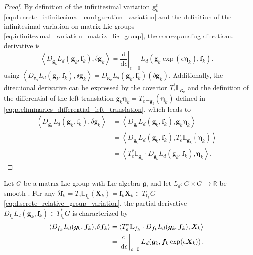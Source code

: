 \begin{proof}
By definition of the infinitesimal variation $\bm{g}_k^\epsilon$ \eqref{eq:discrete_infinitesimal_configuration_variation} and the definition of the infinitesimal 
variation on matrix Lie groups \eqref{eq:infinitesimal_variation_matrix_lie_group}, the corresponding directional derivative is
\begin{equation*}
    \left\langle D_{\bm{g}_k}L_d(\bm{g}_k,\bm{f}_k),\delta\bm{g}_k\right\rangle
    =
    \left.\frac{\mathrm d}{\mathrm d\epsilon}\right|_{\epsilon=0}
    L_d\!\left(\bm{g}_k\exp(\epsilon\bm{\eta}_k),\bm{f}_k\right).
\end{equation*}
using $\left\langle D_{\bm{g}_k}L_d(\bm{g}_k,\bm{f}_k),\delta\bm{g}_k\right\rangle = D_{\bm{g}_k}L_d(\bm{g}_k,\bm{f}_k)(\delta\bm{g}_k)$.
Additionally, the directional derivative can be expressed by the covector $T_e^*\mathbb{L}_{\bm{g}_k}$ and the definition of the differential 
of the left translation $\bm{g}_k \bm{\eta}_k = T_e\mathbb{L}_{\bm{g}_k}(\bm{\eta}_k)$ defined in \eqref{eq:preliminaries_differential_left_translation}, which leads to
\begin{align*}
    \left\langle D_{\bm{g}_k}L_d(\bm{g}_k,\bm{f}_k),\delta\bm{g}_k\right\rangle
    &=
    \left\langle D_{\bm{g}_k}L_d(\bm{g}_k,\bm{f}_k),\bm{g}_k \bm{\eta}_k\right\rangle \\
    &=
    \left\langle D_{\bm{g}_k}L_d(\bm{g}_k,\bm{f}_k),T_e\mathbb{L}_{\bm{g}_k}(\bm{\eta}_k)\right\rangle \\
    &=
    \left\langle T_e^*\mathbb{L}_{\bm{g}_k} \cdot D_{\bm{g}_k}L_d(\bm{g}_k,\bm{f}_k),\bm{\eta}_k\right\rangle.
\end{align*}
\end{proof}

\begin{proposition}
\label{prop:directional_derivative_discrete_f}
Let $G$ be a matrix Lie group with Lie algebra $\mathfrak g$, 
and let $L_d:G\times G\rightarrow\mathbb R$ be smooth \cite{Hall2000LieGroups}. 
For any $\delta\bm{f}_k=T_e\mathbb{L}_{\bm{f}_k}(\bm{X}_k)=\bm{f}_k\bm{X}_k\in T_{\bm{f}_k}G$ \eqref{eq:discrete_relative_group_variation}, 
the partial derivative $D_{\bm{f}_k}L_d(\bm{g}_k,\bm{f}_k)\in T_{\bm{f}_k}^*G$ is characterized by
\begin{align}
    \left\langle D_{\bm{f}_k}L_d(\bm{g}_k,\bm{f}_k),\delta\bm{f}_k\right\rangle
    &=
    \left\langle T_e^*\mathbb{L}_{\bm{f}_k} \cdot D_{\bm{f}_k}L_d(\bm{g}_k,\bm{f}_k),\bm{X}_k\right\rangle
    \notag\\
    &=
    \left.\frac{\mathrm d}{\mathrm d\epsilon}\right|_{\epsilon=0}
    L_d\!\left(\bm{g}_k,\bm{f}_k\exp(\epsilon \bm{X}_k)\right).
    \label{eq:directional_derivative_discrete_f}
\end{align}
\end{proposition}

